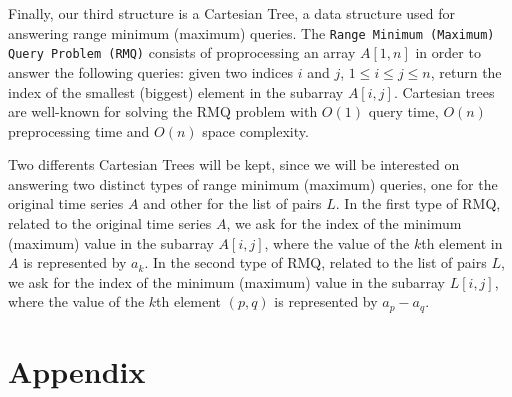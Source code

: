 \documentclass[12pt,letterpaper]{article}
\begin{document}
Finally, our third structure is a Cartesian Tree, a data structure used for 
answering range minimum (maximum) queries. The {\tt Range Minimum (Maximum) Query Problem (RMQ)}
consists of proprocessing  an array $A[1,n]$ in order to answer the following queries:
given two indices $i$ and $j$, $1 \leq i \leq j \leq n$, return the index of the
smallest (biggest) element in the subarray $A[i,j]$.
Cartesian trees \cite{cartesian80} are well-known for solving the RMQ problem with $O(1)$ query time,
$O(n)$ preprocessing time and $O(n)$ space complexity.

Two differents Cartesian Trees will be kept, since we will be interested on answering two distinct types of range minimum
(maximum) queries, one for the original time series $A$ and other for the list of pairs $L$.
In the first type of RMQ, related to the original time series $A$, we ask for the index of the minimum (maximum) value in the subarray
$A[i,j]$, where the value of the $k$th element in $A$ is represented by $a_k$.
In the second type of RMQ, related to the list of pairs $L$,
we ask for the index of the minimum (maximum) value in the subarray
$L[i,j]$, where the value of the $k$th element $(p,q)$ is represented by $a_p - a_q$.






\pagebreak

\section{Appendix}
\end{document}
